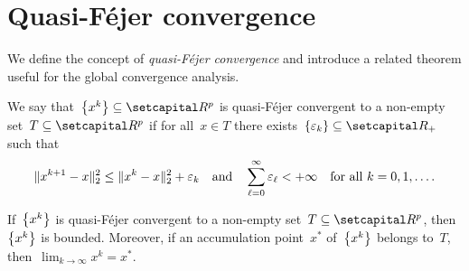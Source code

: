 \documentclass[../main]{subfiles}
\begin{document}
\section{Quasi-F\'ejer convergence} 
We define the concept of \emph{quasi-F\'ejer convergence} and introduce a related theorem useful for the global convergence analysis.
\begin{definition} 
    We say that~$\set*{x^k} \subseteq \setR^p$ is quasi-F\'ejer convergent to a non-empty set~$T \subseteq \setR^p$ if for all~$x \in T$ there exists~$\set{\varepsilon_k} \subseteq \setRpos$ such that
    \begin{equation}
        \norm{x^{k + 1} - x}_2^2 \le \norm{x^k - x}_2^2 + \varepsilon_k \eqand \sum_{\ell = 0}^{\infty} \varepsilon_\ell < + \infty \forallcondition{k = 0, 1, \dots}
        .\end{equation}
\end{definition}

\begin{theorem} 
    If~$\set*{x^k}$ is quasi-F\'ejer convergent to a non-empty set~$T \subseteq \setR^p$, then~$\set*{x^k}$ is bounded.
    Moreover, if an accumulation point~$x^*$ of~$\set*{x^k}$ belongs to~$T$, then~$\lim_{k \to \infty} x^k = x^*$.
\end{theorem}
\end{document}
